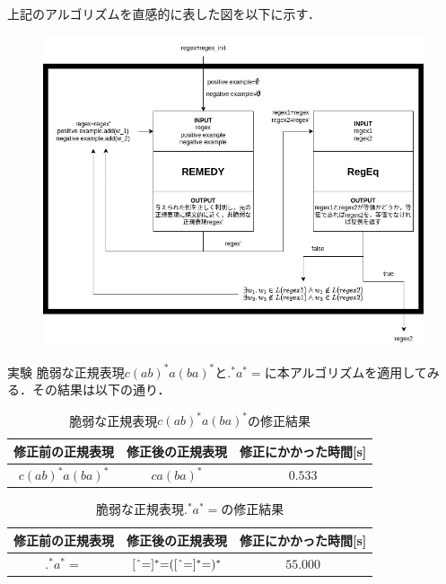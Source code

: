 \documentclass[uplatex,dvipdfmx,11pt,notheorems,aspectratio = 169]{beamer}
\theoremstyle{definition}
\begin{document}
\begin{frame}
  上記のアルゴリズムを直感的に表した図を以下に示す．
  \begin{figure}[H] %
    \centering
    \includegraphics[width=0.65\linewidth]{seminar.jpg}
  \end{figure}
\end{frame}

\begin{frame}{実験}
  脆弱な正規表現$c(ab)^*a(ba)^*$と$.^*a^*\mathrm{=}$に本アルゴリズムを適用してみる．その結果は以下の通り．
  \begin{table}[H]
    \centering
    \caption{脆弱な正規表現$c(ab)^*a(ba)^*$の修正結果\label{vul_res1}}
    \begin{tabular}{c|c|c} \hline \hline
        修正前の正規表現 & 修正後の正規表現  & 修正にかかった時間[s]\\\hline
        $c(ab)^*a(ba)^*$  & $ca(ba)^*$ &$0.533$ \\\hline
    \end{tabular}
  \end{table}

  \begin{table}[H]
    \centering
    \caption{脆弱な正規表現$.^*a^*\mathrm{=}$の修正結果\label{vul_res2}}
    \begin{tabular}{c|c|c} \hline \hline
        修正前の正規表現 & 修正後の正規表現  & 修正にかかった時間[s]\\\hline
        $.^*a^*\mathrm{=}$  & $[\mathchar`^\mathrm{=}]^*\mathrm{=}([\mathchar`^\mathrm{=}]^*\mathrm{=})^*$ &$55.000$ \\\hline
    \end{tabular}
  \end{table}
\end{frame}
\end{document}
